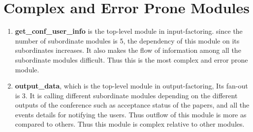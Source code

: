 \documentclass[english,a4paper,12pt]{report}
\begin{document}
\section{Complex and Error Prone Modules}
\begin{enumerate}
    \item \textbf{get\_conf\_user\_info} is the top-level module in input-factoring. since the number of subordinate modules is 5, the dependency of this module on its subordinates increases. It also makes the flow of information among all the subordinate modules difficult. Thus this is the most complex and error prone module.
    
    \item \textbf{output\_data}, which is the top-level module in output-factoring, Its
fan-out is 3. It is calling different subordinate modules depending on the
different outputs of the conference such as  acceptance status of the  papers, and all the events details for notifying the users. Thus outflow of this module is more as compared to others. Thus this module is
complex relative to other modules.
\end{enumerate}
\end{document}
